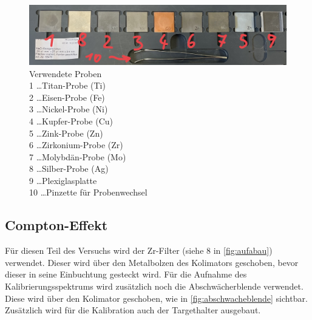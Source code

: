 \documentclass[12pt,english,ngerman]{scrartcl}
\begin{document}
\begin{figure}[H]
	\begin{center}
		\includegraphics[width =\textwidth]{./figures/proben.jpg}
	\end{center}
	\caption[Verwendete Proben] {Verwendete Proben            \\
		1 \dots Titan-Probe (Ti)     \\
		2 \dots Eisen-Probe (Fe)     \\
		3 \dots Nickel-Probe (Ni)    \\
		4 \dots Kupfer-Probe (Cu)    \\
		5 \dots Zink-Probe (Zn)      \\
		6 \dots Zirkonium-Probe (Zr) \\
		7 \dots Molybdän-Probe (Mo)  \\
		8 \dots Silber-Probe (Ag)    \\
		9 \dots Plexiglasplatte      \\
		10 \dots Pinzette für Probenwechsel
	}\label{fig:proben}
\end{figure}

\subsection{Compton-Effekt}

Für diesen Teil des Versuchs wird der Zr-Filter (siehe 8 in
\autoref{fig:aufabau}) verwendet. Dieser wird über den Metalbolzen des
Kolimators geschoben, bevor dieser in seine Einbuchtung gesteckt wird. Für die
Aufnahme des Kalibrierungsspektrums wird zusätzlich noch die Abschwächerblende
verwendet. Diese wird über den Kolimator geschoben, wie in
\autoref{fig:abschwacheblende} sichtbar. Zusätzlich wird für die Kalibration
auch der Targethalter ausgebaut.
\end{document}
